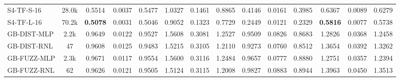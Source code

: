 \begin{table*}[h]
{\begin{tabular}{l c >{\columncolor{gray!20}}ccc >{\columncolor{gray!20}}ccc >{\columncolor{gray!20}}ccc >{\columncolor{gray!20}}ccc}
            \hline
            S4-TF-S-16 & 28.0k & 0.5514 & 0.0037 & 0.5477 & 1.0327 & 0.1461 & 0.8865 & 0.4146 & 0.0161 & 0.3985 & 0.6367 & 0.0089 & 0.6279 \\
            S4-TF-L-16 & 70.2k & \textbf{0.5078} & 0.0031 & 0.5046 & 0.9052 & 0.1323 & 0.7729 & 0.2449 & 0.0121 & 0.2329 & \textbf{0.5816} & 0.0077 & 0.5738 \\
            \hline
            GB-DIST-MLP & 2.2k & 0.9649 & 0.0122 & 0.9527 & 1.5608 & 0.3081 & 1.2527 & 0.9509 & 0.0826 & 0.8683 & 1.2826 & 0.0368 & 1.2458 \\
            GB-DIST-RNL & 47 & 0.9608 & 0.0125 & 0.9483 & 1.5215 & 0.3105 & 1.2110 & 0.9273 & 0.0760 & 0.8512 & 1.3654 & 0.0392 & 1.3262 \\
            \hline
            GB-FUZZ-MLP & 2.3k & 0.9671 & 0.0117 & 0.9554 & 1.5600 & 0.3116 & 1.2484 & 0.9657 & 0.0777 & 0.8880 & 1.2751 & 0.0357 & 1.2394 \\
            GB-FUZZ-RNL & 62 & 0.9626 & 0.0121 & 0.9505 & 1.5124 & 0.3115 & 1.2008 & 0.9827 & 0.0883 & 0.8944 & 1.3963 & 0.0450 & 1.3513 \\
            \hline
            \hline
        \end{tabular}
    }
\end{table*}


